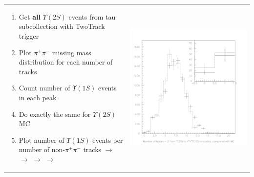 \documentclass[landscape]{article}
\begin{document}
\begin{tabular}{p{0.5\linewidth} p{0.5\linewidth}}
  \begin{minipage}{\linewidth}

  \begin{enumerate}

    \item Get {\bf all} $\Upsilon(2S)$ events from tau subcollection with TwoTrack trigger

    \item Plot $\pi^+\pi^-$ missing mass distribution for each number of tracks



    \item Count number of $\Upsilon(1S)$ events in each peak

    \item Do exactly the same for $\Upsilon(2S)$ MC

    \item Plot number of $\Upsilon(1S)$ events per number of non-$\pi^+\pi^-$ tracks $\longrightarrow$ $\longrightarrow$ $\longrightarrow$ $\longrightarrow$

  \end{enumerate}

  \end{minipage} &
  \begin{minipage}{\linewidth} \includegraphics[width=\linewidth]{cascades_tracks_boost_tt.pdf} \end{minipage}
\end{tabular}
\end{document}
